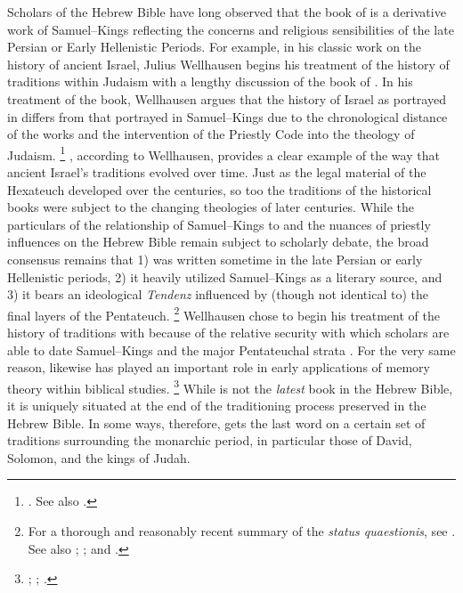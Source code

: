 Scholars of the Hebrew Bible have long observed that the book of \chronicles is a derivative work of Samuel--Kings reflecting the concerns and religious sensibilities of the late Persian or Early Hellenistic Periods. For example, in his classic work on the history of ancient Israel, Julius Wellhausen begins his treatment of the history of traditions within Judaism with a lengthy discussion of the book of \chronicles. In his treatment of the book, Wellhausen argues that the history of Israel as portrayed in \chronicles differs from that portrayed in Samuel--Kings due to the chronological distance of the works and the intervention of the Priestly Code into the theology of \secondtemple Judaism.%
    \footnote{%
        \cite[171--172]{wellhausen1957}. See also
        \cite{wright_ulrich-wright1992}.}
\chronicles, according to Wellhausen, provides a clear example of the way that ancient Israel's traditions evolved over time. Just as the legal material of the Hexateuch developed over the centuries, so too the traditions of the historical books were subject to the changing theologies of later centuries. While the particulars of the relationship of Samuel--Kings to \chronicles and the nuances of priestly influences on the Hebrew Bible remain subject to scholarly debate, the broad consensus remains that 1) \chronicles was written sometime in the late Persian or early Hellenistic periods, 2) it heavily utilized Samuel--Kings as a literary source, and 3) it bears an ideological \emph{Tendenz} influenced by (though not identical to) the final layers of the Pentateuch.%
    \footnote{For a thorough and reasonably recent summary of the \emph{status quaestionis}, see 
        \cite[72--89]{knoppers2003}. See also
        \cite{japhet1993};
        \cite{japhet2009};
        \cite{braun1986} and
        \cite{coggins1976}.}
Wellhausen chose to begin his treatment of the history of traditions with \chronicles because of the relative security with which scholars are able to date Samuel--Kings and the major Pentateuchal strata \visavis \chronicles. For the very same reason, \chronicles likewise has played an important role in early applications of memory theory within biblical studies.%
    \footnote{%
        \cite{benzvi_st2017};
        \cite{benzvi-a_evans-williams2013};
        \cite{benzvi-b_evans-williams2013}.}
While \chronicles is not the \emph{latest} book in the Hebrew Bible, it is uniquely situated at the end of the traditioning process preserved in the Hebrew Bible. In some ways, therefore, \chronicles gets the last word on a certain set of traditions surrounding the monarchic period, in particular those of David, Solomon, and the kings of Judah. 

